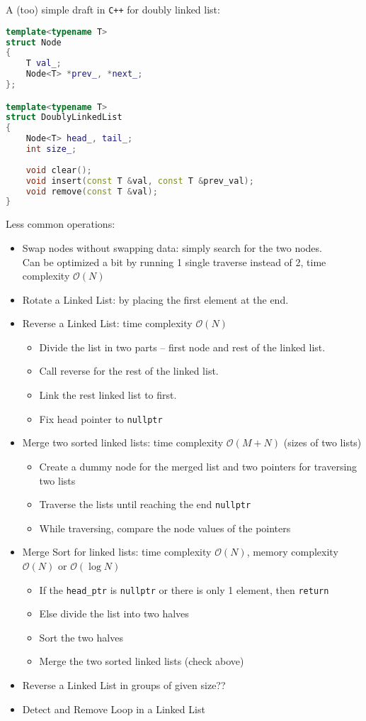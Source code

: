 A (too) simple draft in \texttt{C++} for doubly linked list:
\begin{lstlisting}[language=C++]
template<typename T>
struct Node
{
	T val_;
	Node<T> *prev_, *next_;
};

template<typename T>
struct DoublyLinkedList
{
	Node<T> head_, tail_;
	int size_;
	
	void clear();
	void insert(const T &val, const T &prev_val);
	void remove(const T &val);
}
\end{lstlisting}

Less common operations:
\begin{itemize}
	\item Swap nodes without swapping data: simply search for the two nodes.\\
	Can be optimized a bit by running 1 single traverse instead of 2, time complexity $\mathcal{O}(N)$
	\item Rotate a Linked List: by placing the first element at the end.
	\item Reverse a Linked List: time complexity $\mathcal{O}(N)$
	\begin{itemize}
		\item Divide the list in two parts – first node and rest of the linked list.
		\item Call reverse for the rest of the linked list.
		\item Link the rest linked list to first.
		\item Fix head pointer to \texttt{nullptr}
	\end{itemize}
	\item Merge two sorted linked lists: time complexity $\mathcal{O}(M + N)$ (sizes of two lists)
	\begin{itemize}
		\item Create a dummy node for the merged list and two pointers for traversing two lists
		\item Traverse the lists until reaching the end \texttt{nullptr}
		\item While traversing, compare the node values of the pointers
	\end{itemize}
	\item Merge Sort for linked lists: time complexity $\mathcal{O}(N)$, memory complexity $\mathcal{O}(N)$ or $\mathcal{O}(\log N)$
	\begin{itemize}
		\item If the \texttt{head\_ptr} is \texttt{nullptr} or there is only 1 element, then \texttt{return}
		\item Else divide the list into two halves
		\item Sort the two halves
		\item Merge the two sorted linked lists (check above)
	\end{itemize}
	\item Reverse a Linked List in groups of given size??
	\item Detect and Remove Loop in a Linked List
\end{itemize}

